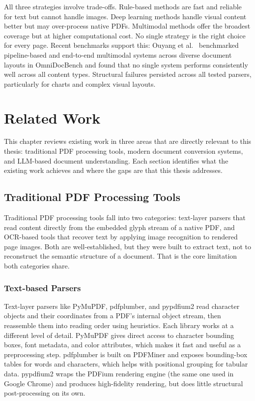 \documentclass[12pt]{article}
\begin{document}
All three strategies involve trade-offs. Rule-based methods are fast and
reliable for text but cannot handle images. Deep learning methods handle visual
content better but may over-process native PDFs. Multimodal methods offer the
broadest coverage but at higher computational cost. No single strategy is the
right choice for every page. Recent benchmarks support this: Ouyang et al.\
\cite{omnidocbench2025} benchmarked pipeline-based and end-to-end multimodal
systems across diverse document layouts in OmniDocBench and found that no single
system performs consistently well across all content types. Structural failures
persisted across all tested parsers, particularly for charts and complex visual
layouts.


\section{Related Work}

This chapter reviews existing work in three areas that are directly relevant to
this thesis: traditional PDF processing tools, modern document conversion
systems, and LLM-based document understanding. Each section identifies what
the existing work achieves and where the gaps are that this thesis addresses.

\subsection{Traditional PDF Processing Tools}

Traditional PDF processing tools fall into two categories: text-layer parsers
that read content directly from the embedded glyph stream of a native PDF, and
OCR-based tools that recover text by applying image recognition to rendered
page images. Both are well-established, but they were built to extract text,
not to reconstruct the semantic structure of a document. That is the core
limitation both categories share.

\subsubsection{Text-based Parsers}

Text-layer parsers like PyMuPDF, pdfplumber, and pypdfium2 read character
objects and their coordinates from a PDF's internal object stream, then
reassemble them into reading order using heuristics. Each library works at a
different level of detail. PyMuPDF gives direct access to character bounding
boxes, font metadata, and color attributes, which makes it fast and useful as
a preprocessing step. pdfplumber is built on PDFMiner and exposes bounding-box
tables for words and characters, which helps with positional grouping for
tabular data. pypdfium2 wraps the PDFium rendering engine (the same one
used in Google Chrome) and produces high-fidelity rendering, but does
little structural post-processing on its own.
\end{document}
